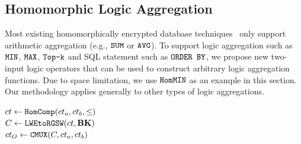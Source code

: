 \subsection{Homomorphic Logic Aggregation}\label{block: minmax}
Most existing homomorphically encrypted database techniques~\cite{aphadb, heda} 
only support arithmetic aggregation (e.g., $\texttt{SUM}$ or $\texttt{AVG}$).
To support logic aggregation 
such as $\texttt{MIN}$, $\texttt{MAX}$, $\texttt{Top-k}$ and SQL statement such as $\texttt{ORDER BY}$, 
we propose new two-input logic operators
that can be used to construct arbitrary logic aggregation functions. 
Due to space limitation, we use $\hommin$ as an example in this section. 
Our methodology applies generally to other types of logic aggregations.


\begin{algorithm}[t!]
    \caption{$\hommin$}
    \label{algo: hommin}
    $ct \leftarrow \texttt{HomComp}(ct_a, ct_b, \leq)$ \\
    $C \leftarrow \texttt{LWEtoRGSW}(ct,{\mathbf{BK}})$ \\
    $ct_O \leftarrow \texttt{CMUX}(C, ct_a, ct_b)$ \\
    
\end{algorithm}

